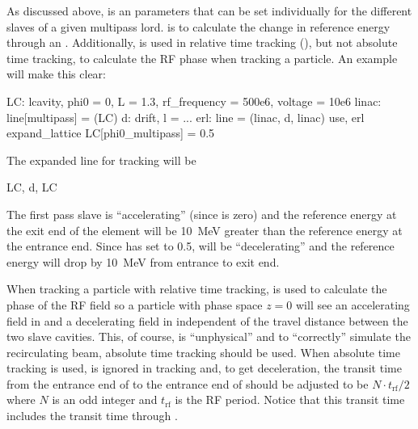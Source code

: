 As discussed above,  is an  parameters that can be set individually
for the different slaves of a given multipass lord.  is to calculate the change
in reference energy through an . Additionally,  is used in relative
time tracking (), but not absolute time tracking, to calculate the RF phase when tracking
a particle. An example will make this clear:
\begin{example}
  LC: lcavity, phi0 = 0, L = 1.3, rf_frequency = 500e6, voltage = 10e6
  linac: line[multipass] = (LC)
  d: drift, l = ...
  erl: line = (linac, d, linac)
  use, erl
  expand_lattice
  LC[phi0_multipass] = 0.5
\end{example}
The expanded line for tracking will be
\begin{example}
  LC, d, LC
\end{example}
The first pass slave  is ``accelerating'' (since  is zero) and the reference
energy at the exit end of the element will be 10~MeV greater than the reference energy at the
entrance end.  Since  has  set to 0.5,  will be
``decelerating'' and the reference energy will drop by 10~MeV from entrance to exit end.

When tracking a particle with relative time tracking,  is used to calculate the
phase of the RF field so a particle with phase space $z = 0$ will see an accelerating field in
 and a decelerating field in  independent of the travel distance between the two
slave cavities. This, of course, is ``unphysical'' and to ``correctly'' simulate the recirculating
beam, absolute time tracking should be used. When absolute time tracking is used,
 is ignored in tracking and, to get deceleration, the transit time from the
entrance end of  to the entrance end of  should be adjusted to be $N \cdot
t_\text{rf} / 2$ where $N$ is an odd integer and $t_\text{rf}$ is the RF period. Notice that this
transit time includes the transit time through .
